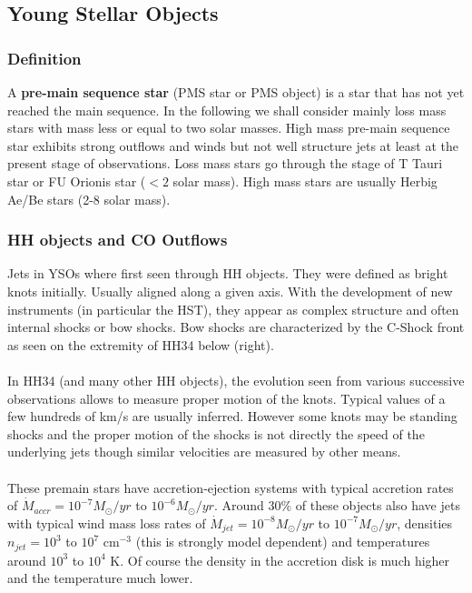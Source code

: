 \documentclass[10pt,a4paper,english]{article}
\begin{document}
\subsection{Young Stellar Objects}
\subsubsection{Definition}
A \textbf{pre-main sequence star} (PMS star or PMS object) is a star that has not yet reached the main sequence. In the following we shall consider mainly loss mass stars with mass less or equal to two solar masses. High mass pre-main sequence star exhibits strong outflows and winds but not well structure jets at least at the present stage of observations. Loss mass stars go through the stage of T Tauri star or FU Orionis star ($<2$ solar mass). High mass stars are usually Herbig Ae/Be stars (2-8 solar mass).
\subsubsection{HH objects and CO Outflows}
Jets in YSOs where first seen through HH objects. They were defined as bright knots initially. Usually aligned along a given axis. With the development of new instruments (in particular the HST), they appear as complex structure and often internal shocks or bow shocks. Bow shocks are characterized by the C-Shock front as seen on the extremity of HH34 below (right).\\
\\
In HH34 (and many other HH objects), the evolution seen from various successive observations allows to measure proper motion of the knots. Typical values of a few hundreds of km/s are usually inferred. However some knots may be standing shocks and the proper motion of the shocks is not directly the speed of the underlying jets though similar velocities are measured by other means.\\
\\
These premain stars have accretion-ejection systems with typical accretion rates of $\dot{M}_{accr}=10^{-7}M_{\odot} /yr$ to $10^{-6}M_{\odot} /yr$. Around $30\%$ of these objects also have jets with typical wind mass loss rates of $\dot{M}_{jet}=10^{-8}M_{\odot} /yr$ to $10^{-7}M_{\odot} /yr$, densities $n_{jet}=10^3$ to $10^7$ cm$^{-3}$ (this is strongly model dependent) and temperatures around $10^3$ to $10^4$ K. Of course the density in the accretion disk is much higher and the temperature much lower.
\end{document}
